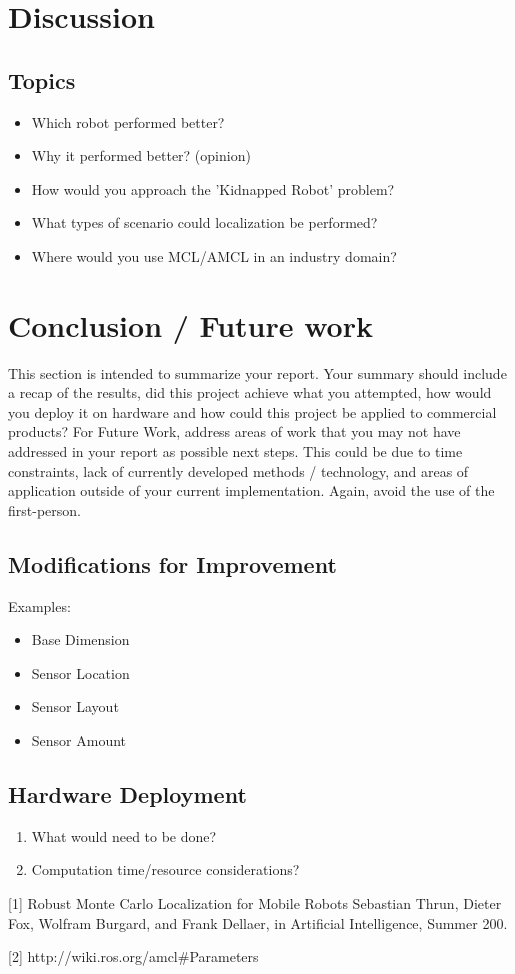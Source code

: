 \documentclass[10pt,journal,compsoc]{IEEEtran}
\begin{document}
\section{Discussion}

 

\subsection{Topics}
\begin{itemize}
\item Which robot performed better?
\item Why it performed better? (opinion)
\item How would you approach the 'Kidnapped Robot' problem?
\item What types of scenario could localization be performed?
\item Where would you use MCL/AMCL in an industry domain?
\end {itemize}

\section{Conclusion / Future work}
This section is intended to summarize your report. Your summary should include a recap of the results, did this project achieve what you attempted, how would you deploy it on hardware and how could this project be applied to commercial products? 
For Future Work, address areas of work that you may not have addressed in your report as possible next steps. This could be due to time constraints, lack of currently developed methods / technology, and areas of application outside of your current implementation. Again, avoid the use of the first-person.

\subsection{Modifications for Improvement}
Examples:
\begin{itemize}
\item Base Dimension
\item Sensor Location
\item Sensor Layout
\item Sensor Amount
\end{itemize}

\subsection{Hardware Deployment}
\begin{enumerate}
\item What would need to be done?
\item Computation time/resource considerations?
\end{enumerate}






[1] Robust Monte Carlo Localization for Mobile Robots Sebastian Thrun, Dieter Fox, Wolfram Burgard, and Frank Dellaer, in Artificial Intelligence, Summer 200.

[2] http://wiki.ros.org/amcl#Parameters
\end{document}
